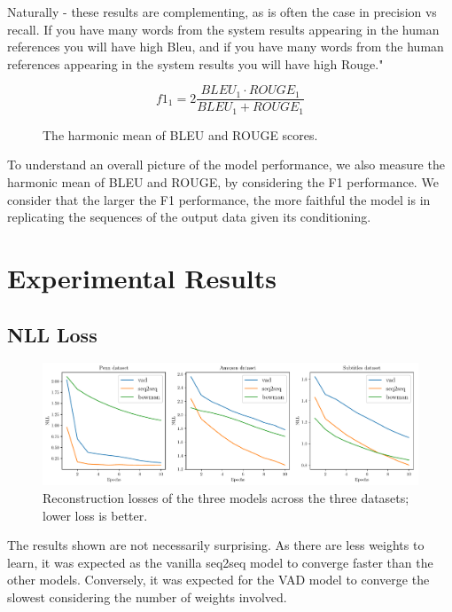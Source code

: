 \documentclass[12pt,twoside]{report}
\begin{document}
Naturally - these results are complementing, as is often the case in precision vs recall. If you have many words from the system results appearing in the human references you will have high Bleu, and if you have many words from the human references appearing in the system results you will have high Rouge."

\begin{figure}[!ht]
	\begin{equation}
		f1_{1} = 2 \frac{BLEU_1 \cdot ROUGE_1}{BLEU_1 + ROUGE_1}
	\end{equation}
	\caption{The harmonic mean of BLEU and ROUGE scores.}
\end{figure}

To understand an overall picture of the model performance, we also measure the harmonic mean of BLEU and ROUGE, by considering the F1 performance. We consider that the larger the F1 performance, the more faithful the model is in replicating the sequences of the output data given its conditioning.

\chapter{Experimental Results}


\section{NLL Loss}

\begin{figure}[!ht]
	\centering
	\includegraphics[width=150mm]{results/nll.pdf}
	\caption{Reconstruction losses of the three models across the three datasets; lower loss is better. \label{r:nll}}
  \end{figure}

The results shown are not necessarily surprising. As there are less weights to learn, it was expected as the vanilla seq2seq model to converge faster than the other models. Conversely, it was expected for the VAD model to converge the slowest considering the number of weights involved.
\end{document}
